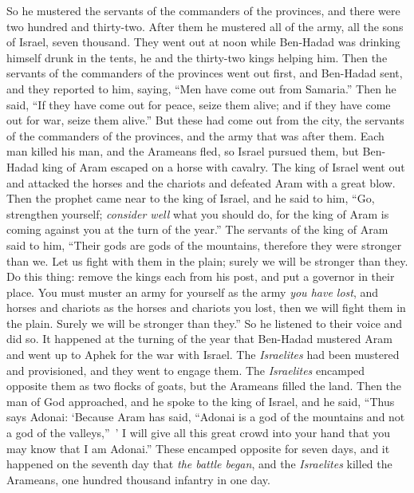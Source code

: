 \begin{biblechapter}
\verse So he mustered the servants of the commanders of the provinces, and there were two hundred and thirty-two. After them he mustered all of the army, all the sons of Israel, seven thousand.
\verse They went out at noon while Ben-Hadad was drinking himself drunk in the tents, he and the thirty-two kings helping him.
\verse Then the servants of the commanders of the provinces went out first, and Ben-Hadad sent, and they reported to him, saying, “Men have come out from Samaria.”
\verse Then he said, “If they have come out for peace, seize them alive; and if they have come out for war, seize them alive.”
\verse But these had come out from the city, the servants of the commanders of the provinces, and the army that was after them.
\verse Each man killed his man, and the Arameans fled, so Israel pursued them, but Ben-Hadad king of Aram escaped on a horse with cavalry.
\verse The king of Israel went out and attacked the horses and the chariots and defeated Aram with a great blow.
\verse Then the prophet came near to the king of Israel, and he said to him, “Go, strengthen yourself; \textit{consider well} what you should do, for the king of Aram is coming against you at the turn of the year.”
\verse The servants of the king of Aram said to him, “Their gods are gods of the mountains, therefore they were stronger than we. Let us fight with them in the plain; surely we will be stronger than they.
\verse Do this thing: remove the kings each from his post, and put a governor in their place.
\verse You must muster an army for yourself as the army \textit{you have lost}, and horses and chariots as the horses and chariots you lost, then we will fight them in the plain. Surely we will be stronger than they.” So he listened to their voice and did so.
\verse It happened at the turning of the year that Ben-Hadad mustered Aram and went up to Aphek for the war with Israel.
\verse The \textit{Israelites} had been mustered and provisioned, and they went to engage them. The \textit{Israelites} encamped opposite them as two flocks of goats, but the Arameans filled the land.
\verse Then the man of God approached, and he spoke to the king of Israel, and he said, “Thus says Adonai: ‘Because Aram has said, “Adonai is a god of the mountains and not a god of the valleys,” ’ I will give all this great crowd into your hand that you may know that I am Adonai.”
\verse These encamped opposite for seven days, and it happened on the seventh day that \textit{the battle began}, and the \textit{Israelites} killed the Arameans, one hundred thousand infantry in one day.

\end{biblechapter}
